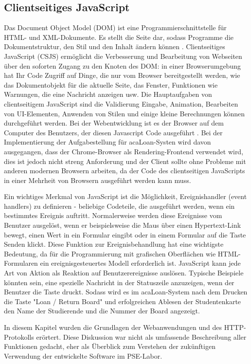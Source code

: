 \subsection{Clientseitiges JavaScript}
\label{sec:theorie:js}
Das Document Object Model (DOM) ist eine Programmierschnittstelle für HTML- und XML-Dokumente. Es stellt die Seite dar, sodass Programme die Dokumentstruktur, den Stil und den Inhalt ändern können \cite{website:dom}. Clientseitiges JavaScript (CSJS) ermöglicht die Verbesserung und Bearbeitung von Webseiten über den soforten Zugang zu den Knoten des DOM: in einer Browserumgebung hat Ihr Code Zugriff auf Dinge, die nur vom Browser bereitgestellt werden, wie das Dokumentobjekt für die aktuelle Seite, das Fenster, Funktionen wie Warnungen, die eine Nachricht anzeigen usw. Die Hauptaufgaben von clientseitigem JavaScript sind die Validierung Eingabe, Animation, Bearbeiten von UI-Elementen, Anwenden von Stilen und einige kleine Berechnungen können durchgeführt werden. Bei der Webentwicklung ist es der Browser auf dem Computer des Benutzers, der diesen Javascript Code ausgeführt \cite{website:csjs}. Bei der Implementierung der Aufgabestellung für acaLoan-Systen wird davon ausgegangen, dass der Chrome-Browser als Rendering-Frontend verwendet wird, dies ist jedoch nicht streng Anforderung und der Client sollte ohne Probleme mit anderen modernen Browsern arbeiten, da der Code des clientseitigen JavaScripts in einer Mehrheit von Browsern ausgeführt werden kann muss. 

Ein wichtiges Merkmal von JavaScript ist die Möglichkeit, Ereignishandler (event handlers) zu definieren - beliebige Codeteile, die ausgeführt werden, wenn ein bestimmtes Ereignis auftritt. Normalerweise werden diese Ereignisse vom Benutzer ausgelöst, wenn er beispielsweise die Maus über einen Hypertext-Link bewegt, einen Wert in ein Formular eingibt oder in einem Formular auf die Taste Senden klickt. Diese Funktion zur Ereignisbehandlung hat eine wichtigste Bedeutung, da für die Programmierung mit grafischen Oberflächen wie HTML-Formularen ein ereignisgesteuertes Modell erforderlich ist. JavaScript kann jede Art von Aktion als Reaktion auf Benutzerereignisse auslösen. Typische Beispiele könnten sein, eine spezielle Nachricht in der Statuszeile anzuzeigen, wenn der Benutzer die Taste druckt. Sodass wird es im acaLoan-System nach dem Drucken die Taste "Loan / Return Board" und erfolgreichen Ablesen der Studentenkarte den Name der Studierende und die Nummer der Board angezeigt.

In diesem Kapitel wurden die Grundlagen der Webanwendungen und des HTTP-Protokolls erörtert. Diese Diskussion war nicht als umfassende Beschreibung aller Funktionen gedacht, eher als Überblick zum Verstehen der zukünftigen Verwendung der entwickelte Software im PSE-Labor. 
